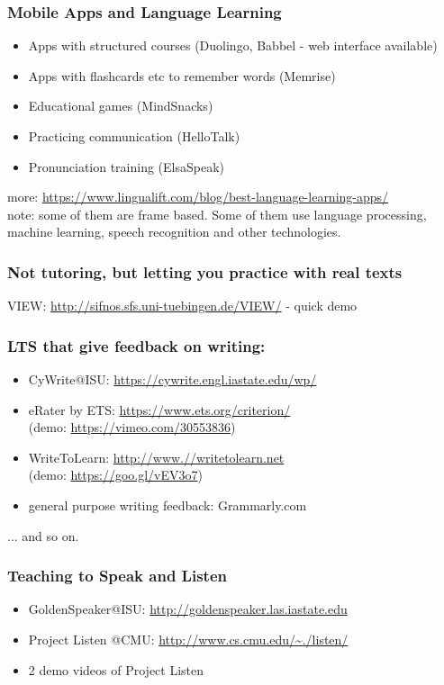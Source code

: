 \documentclass{beamer}
\begin{document}
\begin{frame}
\frametitle{Mobile Apps and Language Learning}
\begin{itemize}
\item Apps with structured courses (Duolingo, Babbel - web interface available)
\item Apps with flashcards etc to remember words (Memrise)
\item Educational games (MindSnacks)
\item Practicing communication (HelloTalk)
\item Pronunciation training (ElsaSpeak)
\end{itemize}
more: \url{https://www.lingualift.com/blog/best-language-learning-apps/}
\\ note: some of them are frame based. Some of them use language processing, machine learning, speech recognition and other technologies.
\end{frame}%

\begin{frame}
\frametitle{Not tutoring, but letting you practice with real texts}
VIEW: \url{http://sifnos.sfs.uni-tuebingen.de/VIEW/} - quick demo
\end{frame} %

\begin{frame}
\frametitle{LTS that give feedback on writing: }
\begin{itemize}
\item CyWrite@ISU: \url{https://cywrite.engl.iastate.edu/wp/}
\item eRater by ETS: \url{https://www.ets.org/criterion/} \\ (demo: \url{https://vimeo.com/30553836})
\item WriteToLearn: \url{http://www.//writetolearn.net} \\ (demo: \url{https://goo.gl/vEV3o7})
\item general purpose writing feedback: Grammarly.com 
\end{itemize}
... and so on. 
\end{frame} %

\begin{frame}
\frametitle{Teaching to Speak and Listen}
\begin{itemize}
\item GoldenSpeaker@ISU: \url{http://goldenspeaker.las.iastate.edu}
\item Project Listen @CMU: \url{http://www.cs.cmu.edu/\~./listen/}
\item 2 demo videos of Project Listen
\end{itemize}
\end{frame} %
\end{document}
